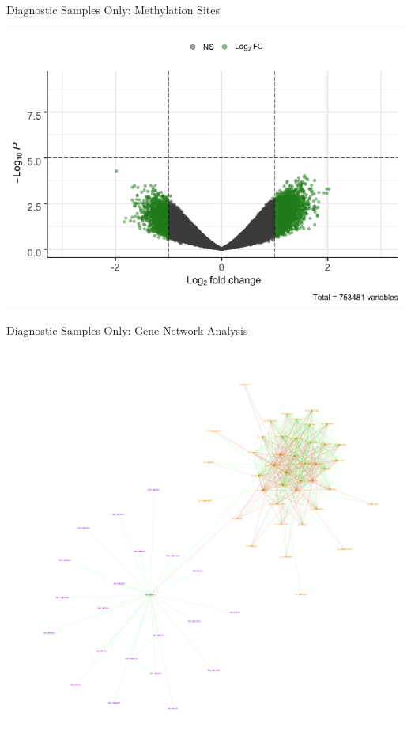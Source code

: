\documentclass[ignorenonframetext,]{beamer}
\begin{document}
\begin{frame}{Diagnostic Samples Only: Methylation Sites}
\protect\hypertarget{diagnostic-samples-only-methylation-sites}{}

\includegraphics[height=0.85\textheight]{final_presentation_slides_files/figure-beamer/DRR_methyl_volcano-1}

\end{frame}

\begin{frame}{Diagnostic Samples Only: Gene Network Analysis}
\protect\hypertarget{diagnostic-samples-only-gene-network-analysis}{}

\begin{center}\includegraphics[width=0.7\linewidth]{images/DRRNet1} \end{center}

\end{frame}
\end{document}
